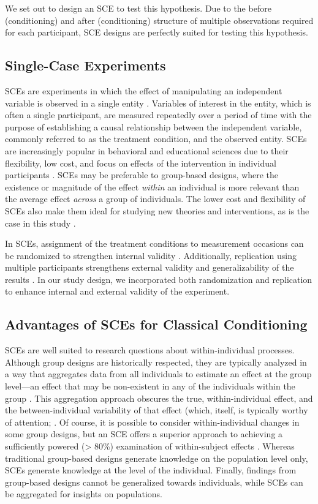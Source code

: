 \documentclass{article}
\begin{document}
We set out to design an SCE to test this hypothesis. Due to the before (conditioning) and after (conditioning) structure of multiple observations required for each participant, SCE designs are perfectly suited for testing this hypothesis.

\subsection{Single-Case Experiments} 

SCEs are experiments in which the effect of manipulating an independent variable is observed in a single entity \autocite{bib9} \autocite{bib10}. Variables of interest in the entity, which is often a single participant, are measured repeatedly over a period of time with the purpose of establishing a causal relationship between the independent variable, commonly referred to as the treatment condition, and the observed entity. SCEs are increasingly popular in behavioral and educational sciences due to their flexibility, low cost, and focus on effects of the intervention in individual participants \autocite{bib11}. SCEs may be preferable to group-based designs, where the existence or magnitude of the effect \emph{within} an individual is more relevant than the average effect \emph{across} a group of individuals. The lower cost and flexibility of SCEs also make them ideal for studying new theories and interventions, as is the case in this study \autocite{bib12}.

In SCEs, assignment of the treatment conditions to measurement occasions can be randomized to strengthen internal validity \autocite{bib13} \autocite{bib14}. Additionally, replication using multiple participants strengthens external validity and generalizability of the results \autocite{bib13} \autocite{bib15}. In our study design, we incorporated both randomization and replication to enhance internal and external validity of the experiment. 

\subsection{Advantages of SCEs for Classical Conditioning} 

SCEs are well suited to research questions about within-individual processes. Although group designs are historically respected, they are typically analyzed in a way that aggregates data from all individuals to estimate an effect at the group level—an effect that may be non-existent in any of the individuals within the group \autocite{bib16}. This aggregation approach obscures the true, within-individual effect, and the between-individual variability of that effect (which, itself, is typically worthy of attention; \autocite{bib17}. Of course, it is possible to consider within-individual changes in some group designs, but an SCE offers a superior approach to achieving a sufficiently powered (> 80\%) examination of within-subject effects \autocite{bib18} \autocite{bib19}. Whereas traditional group-based designs generate knowledge on the population level only, SCEs generate knowledge at the level of the individual. Finally, findings from group-based designs cannot be generalized towards individuals, while SCEs can be aggregated for insights on populations.
\end{document}
